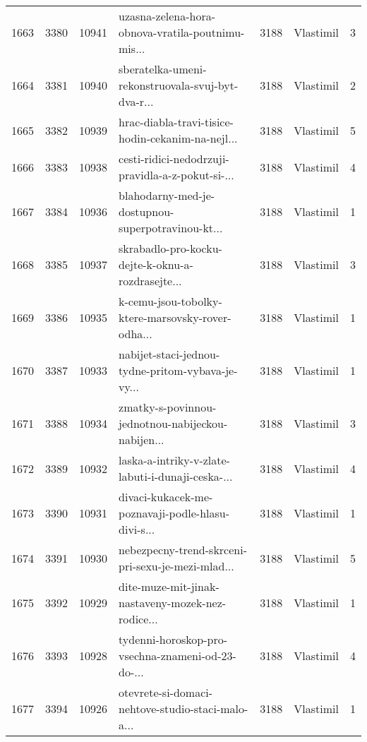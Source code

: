 \begin{tabular}{lrrlrlr}
1663 &       3380 &    10941 &  uzasna-zelena-hora-obnova-vratila-poutnimu-mis... &     3188 &                    Vlastimil &               3 \\
1664 &       3381 &    10940 &  sberatelka-umeni-rekonstruovala-svuj-byt-dva-r... &     3188 &                    Vlastimil &               2 \\
1665 &       3382 &    10939 &  hrac-diabla-travi-tisice-hodin-cekanim-na-nejl... &     3188 &                    Vlastimil &               5 \\
1666 &       3383 &    10938 &  cesti-ridici-nedodrzuji-pravidla-a-z-pokut-si-... &     3188 &                    Vlastimil &               4 \\
1667 &       3384 &    10936 &  blahodarny-med-je-dostupnou-superpotravinou-kt... &     3188 &                    Vlastimil &               1 \\
1668 &       3385 &    10937 &  skrabadlo-pro-kocku-dejte-k-oknu-a-rozdrasejte... &     3188 &                    Vlastimil &               3 \\
1669 &       3386 &    10935 &  k-cemu-jsou-tobolky-ktere-marsovsky-rover-odha... &     3188 &                    Vlastimil &               1 \\
1670 &       3387 &    10933 &  nabijet-staci-jednou-tydne-pritom-vybava-je-vy... &     3188 &                    Vlastimil &               1 \\
1671 &       3388 &    10934 &  zmatky-s-povinnou-jednotnou-nabijeckou-nabijen... &     3188 &                    Vlastimil &               3 \\
1672 &       3389 &    10932 &  laska-a-intriky-v-zlate-labuti-i-dunaji-ceska-... &     3188 &                    Vlastimil &               4 \\
1673 &       3390 &    10931 &  divaci-kukacek-me-poznavaji-podle-hlasu-divi-s... &     3188 &                    Vlastimil &               1 \\
1674 &       3391 &    10930 &  nebezpecny-trend-skrceni-pri-sexu-je-mezi-mlad... &     3188 &                    Vlastimil &               5 \\
1675 &       3392 &    10929 &  dite-muze-mit-jinak-nastaveny-mozek-nez-rodice... &     3188 &                    Vlastimil &               1 \\
1676 &       3393 &    10928 &  tydenni-horoskop-pro-vsechna-znameni-od-23-do-... &     3188 &                    Vlastimil &               4 \\
1677 &       3394 &    10926 &  otevrete-si-domaci-nehtove-studio-staci-malo-a... &     3188 &                    Vlastimil &               1 \\

\end{tabular}
